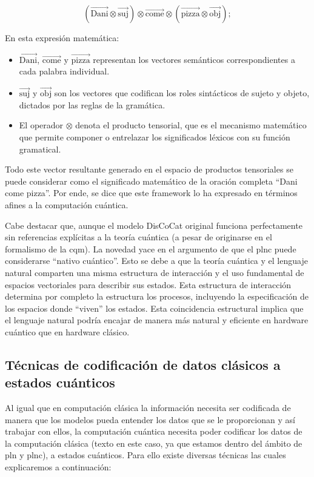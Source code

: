 \[
  (\overrightarrow{\text{Dani}} \otimes \overrightarrow{\text{suj}}) \otimes \overrightarrow{\text{come}} \otimes (\overrightarrow{\text{pizza}} \otimes \overrightarrow{\text{obj}});
\]

En esta expresión matemática:
\begin{itemize}
  \item $\overrightarrow{\text{Dani}}$, $\overrightarrow{\text{come}}$ y $\overrightarrow{\text{pizza}}$ representan los vectores semánticos correspondientes a cada palabra individual.
  \item $\overrightarrow{\text{suj}}$ y $\overrightarrow{\text{obj}}$ son los vectores que codifican los roles sintácticos de sujeto y objeto, dictados por las reglas de la gramática.
  \item El operador $\otimes$ denota el producto tensorial, que es el mecanismo matemático que permite componer o entrelazar los significados léxicos con su función gramatical.
\end{itemize}

Todo este vector resultante generado en el espacio de productos tensoriales se puede considerar como el significado matemático de la oración completa ``Dani come pizza''. Por ende, se dice que este framework lo ha expresado en términos afines a la computación cuántica.

Cabe destacar que, aunque el modelo DisCoCat original funciona perfectamente sin referencias explícitas a la teoría cuántica (a pesar de originarse en el formalismo de la \gls{cqm}). La novedad yace en el argumento de que el \gls{plnc} puede considerarse ``nativo cuántico''. Esto se debe a que la teoría cuántica y el lenguaje natural comparten una misma estructura de interacción y el uso fundamental de espacios vectoriales para describir sus estados. Esta estructura de interacción determina por completo la estructura los procesos, incluyendo la especificación de los espacios donde ``viven'' los estados. Esta coincidencia estructural implica que el lenguaje natural podría encajar de manera más natural y eficiente en hardware cuántico que en hardware clásico.

\subsection{Técnicas de codificación de datos clásicos a estados cuánticos}

Al igual que en computación clásica la información necesita ser codificada de manera que los modelos pueda entender los datos que se le proporcionan y así trabajar con ellos, la computación cuántica necesita poder codificar los datos de la computación clásica (texto en este caso, ya que estamos dentro del ámbito de \gls{pln} y \gls{plnc}), a estados cuánticos. Para ello existe diversas técnicas las cuales explicaremos a continuación:

